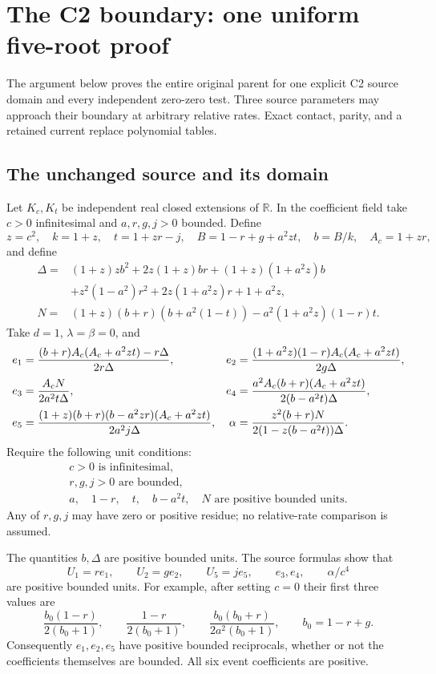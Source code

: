 \section{The C2 boundary: one uniform five-root proof}
\label{sec:c2-unified}

The argument below proves the entire original parent for one explicit
C2 source domain and every independent zero-zero test.  Three source
parameters may approach their boundary at arbitrary relative rates.
Exact contact, parity, and a retained current replace polynomial tables.

\subsection{The unchanged source and its domain}
Let $K_c,K_t$ be independent real closed extensions of $\mathbb R$.
In the coefficient field take $c>0$ infinitesimal and $a,r,g,j>0$ bounded.
Define
\[
 z=c^2,\quad k=1+z,\quad t=1+zr-j,\quad
 B=1-r+g+a^2zt,\quad b=B/k,\quad A_c=1+zr,
\]
and define
\begin{align*}
\Delta={}&(1+z)zb^2+2z(1+z)br+(1+z)(1+a^2z)b\\
 &+z^2(1-a^2)r^2+2z(1+a^2z)r+1+a^2z,\\
N={}&(1+z)(b+r)(b+a^2(1-t))-a^2(1+a^2z)(1-r)t.
\end{align*}
Take $d=1$, $\lambda=\beta=0$, and
\begin{align}
e_1&=\frac{(b+r)A_c(A_c+a^2zt)-r\Delta}{2r\Delta},&
e_2&=\frac{(1+a^2z)(1-r)A_c(A_c+a^2zt)}{2g\Delta},\notag\\
e_3&=\frac{A_cN}{2a^2t\Delta},&
e_4&=\frac{a^2A_c(b+r)(A_c+a^2zt)}{2(b-a^2t)\Delta},\notag\\
e_5&=\frac{(1+z)(b+r)(b-a^2zr)(A_c+a^2zt)}{2a^2j\Delta},&
\alpha&=\frac{z^2(b+r)N}{2(1-z(b-a^2t))\Delta}.
\label{eq:c2u-source}
\end{align}
Require the following unit conditions:
\begin{equation}
\begin{gathered}
c>0\text{ is infinitesimal},\\
r,g,j>0\text{ are bounded},\\
a,\quad 1-r,\quad t,\quad b-a^2t,\quad N
\text{ are positive bounded units}.
\end{gathered}\label{eq:c2u-hyp}
\end{equation}
Any of $r,g,j$ may have zero or positive residue; no relative-rate
comparison is assumed.

The quantities $b,\Delta$ are positive bounded units.  The source formulas
show that
\begin{equation}
U_1=re_1,\qquad U_2=ge_2,\qquad U_5=je_5,
\qquad e_3,e_4,\qquad \alpha/c^4
\label{eq:c2u-units}
\end{equation}
are positive bounded units.  For example, after setting $c=0$ their
first three values are
\[
\frac{b_0(1-r)}{2(b_0+1)},\qquad
\frac{1-r}{2(b_0+1)},\qquad
\frac{b_0(b_0+r)}{2a^2(b_0+1)},\qquad b_0=1-r+g.
\]
Consequently $e_1,e_2,e_5$ have positive bounded reciprocals, whether or
not the coefficients themselves are bounded.  All six event coefficients
are positive.

